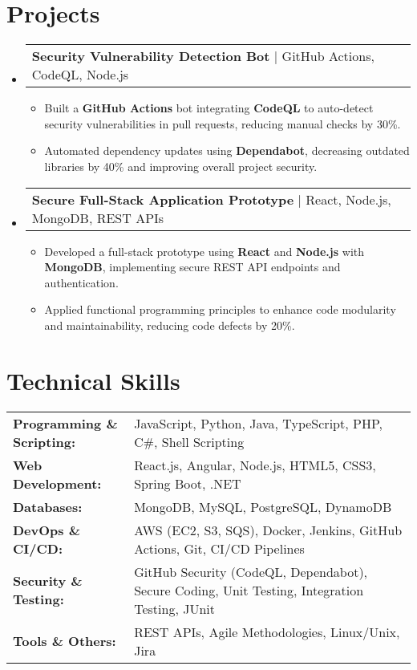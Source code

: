 \documentclass[letterpaper,11pt]{article}
\makeatletter
\newcommand{\resumeItem}[1]{
  \item\footnotesize{
    {#1 \vspace{-2pt}}
  }
}
\newcommand{\resumeProjectHeading}[2]{
    \item
    \begin{tabular*}{1.001\textwidth}{l@{\extracolsep{\fill}}r}
      \small#1 & \textbf{\small #2}\\
    \end{tabular*}\vspace{-7pt}
}
\newcommand{\resumeSubHeadingListStart}{\begin{itemize}[leftmargin=0pt, label={}]}
\newcommand{\resumeSubHeadingListEnd}{\end{itemize}}
\newcommand{\resumeItemListStart}{\begin{itemize}[leftmargin=*]}
\newcommand{\resumeItemListEnd}{\end{itemize}\vspace{-5pt}}
\makeatother
\begin{document}
\section{Projects}
    \vspace{-5pt}
    \resumeSubHeadingListStart
      \resumeProjectHeading
          {\textbf{Security Vulnerability Detection Bot} | GitHub Actions, CodeQL, Node.js}{}
          \resumeItemListStart
              \resumeItem{Built a \textbf{GitHub Actions} bot integrating \textbf{CodeQL} to auto-detect security vulnerabilities in pull requests, reducing manual checks by 30\%.}
              \resumeItem{Automated dependency updates using \textbf{Dependabot}, decreasing outdated libraries by 40\% and improving overall project security.}
          \resumeItemListEnd
          \vspace{-16pt}
      \resumeProjectHeading
          {\textbf{Secure Full-Stack Application Prototype} | React, Node.js, MongoDB, REST APIs}{}
          \resumeItemListStart
              \resumeItem{Developed a full-stack prototype using \textbf{React} and \textbf{Node.js} with \textbf{MongoDB}, implementing secure REST API endpoints and authentication.}
              \resumeItem{Applied functional programming principles to enhance code modularity and maintainability, reducing code defects by 20\%.}
          \resumeItemListEnd
          \vspace{-16pt}
    \resumeSubHeadingListEnd
\vspace{-10pt}
\section{Technical Skills}
        \vspace{-14pt}
        \begin{table}[h]
            \footnotesize
            \begin{tabular}{p{0.3\linewidth} p{0.7\linewidth}}
                \textbf{Programming \& Scripting:} & JavaScript, Python, Java, TypeScript, PHP, C\#, Shell Scripting \\
                \textbf{Web Development:} & React.js, Angular, Node.js, HTML5, CSS3, Spring Boot, .NET \\
                \textbf{Databases:} & MongoDB, MySQL, PostgreSQL, DynamoDB \\
                \textbf{DevOps \& CI/CD:} & AWS (EC2, S3, SQS), Docker, Jenkins, GitHub Actions, Git, CI/CD Pipelines \\
                \textbf{Security \& Testing:} & GitHub Security (CodeQL, Dependabot), Secure Coding, Unit Testing, Integration Testing, JUnit \\
                \textbf{Tools \& Others:} & REST APIs, Agile Methodologies, Linux/Unix, Jira \\
            \end{tabular}
        \end{table}
\end{document}
